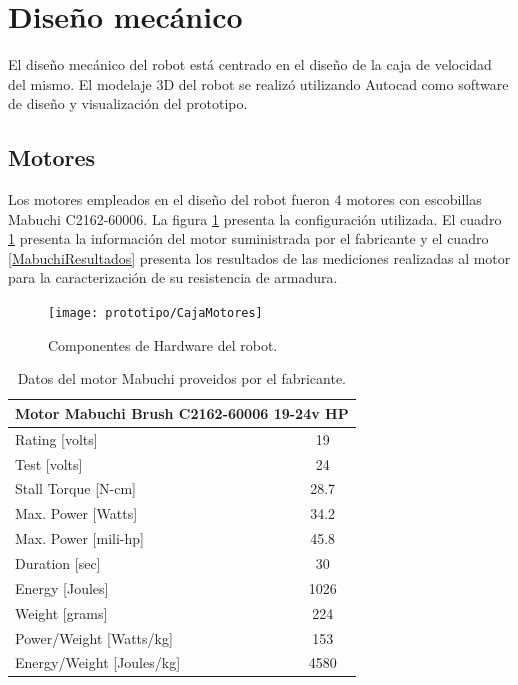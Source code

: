 \section{Diseño mecánico}


El diseño mecánico del robot está centrado en el diseño de la caja de velocidad del mismo. El modelaje 3D del robot se realizó utilizando Autocad como software de diseño y visualización del prototipo.



\subsection{Motores}

Los motores empleados en el diseño del robot fueron 4 motores con escobillas Mabuchi  C2162-60006. La figura \ref{imagen:prototipo/CajaMotores} presenta la configuración utilizada. El cuadro \ref{MabuchiDatasheet} presenta la información del motor suministrada por el fabricante y el cuadro \ref{MabuchiResultados} presenta los resultados de las mediciones realizadas al motor para la caracterización de su resistencia de armadura.

\begin{figure}[H]
	\centering
	\texttt{[image: prototipo/CajaMotores]}
	\caption[Motores Mabuchi empleados en el diseño del prototipo]{Componentes de Hardware del robot.}
	\label{imagen:prototipo/CajaMotores}
\end{figure}

\begin{table}[htbp]
	\caption{Datos del motor Mabuchi proveidos por el fabricante.}
	\centering
	\begin{tabular}{|l|c|}
		\hline
		\multicolumn{ 2}{|c|}{\textbf{Motor  Mabuchi Brush C2162-60006 19-24v HP}} \\ \hline
		Rating [volts] & 19 \\ \hline
		Test [volts] & 24 \\ \hline
		Stall Torque [N-cm] & 28.7 \\ \hline
		Max. Power [Watts] & 34.2 \\ \hline
		Max. Power [mili-hp] & 45.8 \\ \hline
		Duration [sec] & 30 \\ \hline
		Energy [Joules] & 1026 \\ \hline
		Weight [grams] & 224 \\ \hline
		Power/Weight [Watts/kg] & 153 \\ \hline
		Energy/Weight [Joules/kg] & 4580 \\ \hline
	\end{tabular}
	\label{MabuchiDatasheet}
\end{table}



